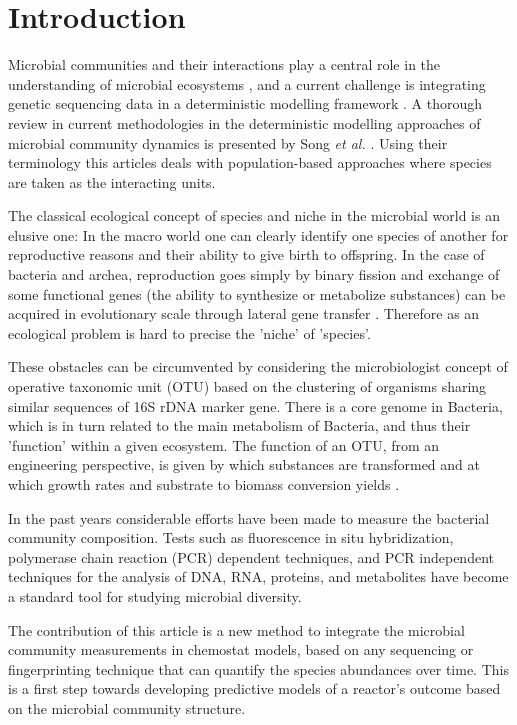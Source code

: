 \documentclass[3p,times]{elsarticle}
\begin{document}
\section{Introduction}


Microbial communities and their interactions play a central role in the understanding of microbial ecosystems \cite{West2007}, and a current challenge is integrating genetic sequencing data in a deterministic modelling framework \cite{Widder2016,WADE201664}. A thorough review in current methodologies in the deterministic modelling approaches of microbial community dynamics is presented by Song \textit{et al.} \cite{Song2014}. Using their terminology this articles deals with population-based approaches where species are taken as the interacting units.

The classical ecological concept of species and niche in the microbial world is an elusive one: In the macro world one can clearly identify one species of another for reproductive reasons and their ability to give birth to offspring. In the case of bacteria and archea, reproduction goes simply by binary fission and exchange of some functional genes (the ability to synthesize or metabolize substances) can be acquired in evolutionary scale through lateral gene transfer \cite{Boucher2003}. Therefore as an ecological problem is hard to precise the 'niche' of 'species'.

These obstacles can be circumvented by considering the microbiologist concept of operative taxonomic unit (OTU) based on the clustering of organisms sharing similar sequences of 16S rDNA marker gene. There is a core genome in Bacteria, which is in turn related to the main metabolism of Bacteria, and thus their 'function' within a given ecosystem. The function of an OTU, from an engineering perspective, is given by which substances are transformed and at which growth rates and substrate to biomass conversion yields \cite{Muyzer1993}.

In the past years considerable efforts have been made to measure the bacterial community composition. Tests such as fluorescence in situ hybridization, polymerase chain reaction (PCR) dependent techniques, and PCR independent techniques for the analysis of DNA, RNA, proteins, and metabolites have become a standard tool for studying  microbial diversity\cite{FERRERA2016790}. 

The contribution of this article is a new method to integrate the microbial community measurements in chemostat models, based on any sequencing or fingerprinting technique that can quantify the species abundances over time. This is a first step towards developing predictive models of a reactor's outcome based on the microbial community structure.
\end{document}
